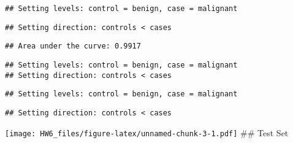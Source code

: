 \documentclass[]{article}
\newenvironment{Shaded}{\begin{snugshade}}{\end{snugshade}}
\newcommand{\DataTypeTok}[1]{\textcolor[rgb]{0.13,0.29,0.53}{#1}}
\newcommand{\DecValTok}[1]{\textcolor[rgb]{0.00,0.00,0.81}{#1}}
\newcommand{\KeywordTok}[1]{\textcolor[rgb]{0.13,0.29,0.53}{\textbf{#1}}}
\newcommand{\NormalTok}[1]{#1}
\newcommand{\OperatorTok}[1]{\textcolor[rgb]{0.81,0.36,0.00}{\textbf{#1}}}
\newcommand{\StringTok}[1]{\textcolor[rgb]{0.31,0.60,0.02}{#1}}
\begin{document}
\begin{verbatim}
## Setting levels: control = benign, case = malignant
\end{verbatim}

\begin{verbatim}
## Setting direction: controls < cases
\end{verbatim}

\begin{verbatim}
## Area under the curve: 0.9917
\end{verbatim}

\begin{Shaded}
\end{Shaded}

\begin{verbatim}
## Setting levels: control = benign, case = malignant
## Setting direction: controls < cases
\end{verbatim}

\begin{verbatim}
## Setting levels: control = benign, case = malignant
\end{verbatim}

\begin{verbatim}
## Setting direction: controls < cases
\end{verbatim}

\texttt{[image: HW6\_files/figure-latex/unnamed-chunk-3-1.pdf]} \#\# Test
Set

\begin{Shaded}
\end{Shaded}
\end{document}
